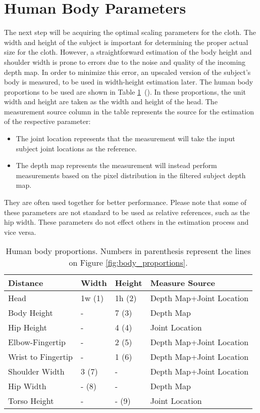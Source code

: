 \section{Human Body Parameters}
\label{section_human_body_parameters}

The next step will be acquiring the optimal scaling parameters for the cloth. The width and height of the subject is important for determining the proper actual size for the cloth. However, a straightforward estimation of the body height and shoulder width is prone to errors due to the noise and quality of the incoming depth map. In order to minimize this error, an upscaled version of the subject's body is measured, to be used in width-height estimation later. The human body proportions to be used are shown in Table \ref{tbl:human_body_proportions}~(\cite{Willis2012}). In these proportions, the unit width and height are taken as the width and height of the head. The measurement source column in the table represents the source for the estimation of the respective parameter:
\begin{itemize} 
\item
The joint location represents that the measurement will take the input subject joint locations as the reference.
\item 
The depth map represents the measurement will instead perform measurements based on the pixel distribution in the filtered subject depth map. 
\end{itemize}
They are often used together for better performance. Please note that some of these parameters are not standard to be used as relative references, such as the hip width. These parameters do not effect others in the estimation process and vice versa.

\begin{table}
\center
\begin{tabular}{ | l | l | l | l |}
\hline
\textbf{Distance} & \textbf{Width} & \textbf{Height} & \textbf{Measure Source} \\ \hline
Head & 1w (1) & 1h (2) & Depth Map+Joint Location \\ \hline
Body Height & - & 7 (3) & Depth Map \\ \hline
Hip Height & - & 4 (4) & Joint Location \\ \hline
Elbow-Fingertip & - & 2 (5) & Depth Map+Joint Location \\ \hline
Wrist to Fingertip & - & 1 (6) & Depth Map+Joint Location \\ \hline
Shoulder Width & 3 (7) & - & Depth Map+Joint Location \\ \hline
Hip Width & - (8) & - & Depth Map \\ \hline
Torso Height & - & - (9) & Joint Location \\ 
\hline
\end{tabular}
\caption{Human body proportions. Numbers in parenthesis represent the lines on Figure \ref{fig:body_proportions}.}
\label{tbl:human_body_proportions}
\end{table}

